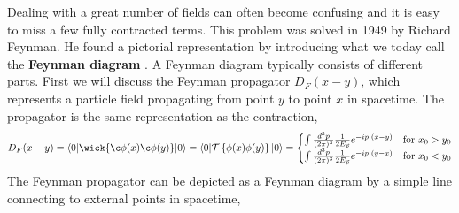 Dealing with a great number of fields can often become confusing and it is easy to miss a few fully contracted terms. This problem was solved in 1949 by Richard Feynman. He found a pictorial representation by introducing what we today call the \textbf{Feynman diagram} \cite{FeynmanDiagram}. A Feynman diagram typically consists of different parts. First we will discuss the Feynman propagator $D_F(x-y)$, which represents a particle field propagating from point $y$ to point $x$ in spacetime. The propagator is the same representation as the contraction, \ie
\begin{equation} \label{eq:Propagator}
    D_F(x-y) = \braket{0| \wick{\c\phi(x)\c\phi(y)} |0} = \braket{0|\mathcal{T}\left\{ \phi(x)\phi(y) \right\} |0} = 
    \begin{cases}
        \int \frac{d^3p}{(2\pi)^3}\frac{1}{2E_{\vec{p}}}e^{-ip\cdot(x-y)} &\text{for } x_0 > y_0 \\
        \int \frac{d^3p}{(2\pi)^3}\frac{1}{2E_{\vec{p}}}e^{-ip\cdot(y-x)} &\text{for } x_0 < y_0
    \end{cases}
\end{equation}
The Feynman propagator can be depicted as a Feynman diagram by a simple line connecting to external points in spacetime,
